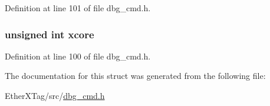 Definition at line 101 of file dbg\-\_\-cmd.\-h.

\hypertarget{structdbg__cmd__type__enable__thread_a78357326dd562d441c3c73f5676ac638}{
\subsubsection[{xcore}]{\setlength{\rightskip}{0pt plus 5cm}unsigned int xcore}}\label{structdbg__cmd__type__enable__thread_a78357326dd562d441c3c73f5676ac638}


Definition at line 100 of file dbg\-\_\-cmd.\-h.



The documentation for this struct was generated from the following file\-:\begin{DoxyCompactItemize}
\item 
Ether\-X\-Tag/src/\hyperlink{dbg__cmd_8h}{dbg\-\_\-cmd.\-h}\end{DoxyCompactItemize}
